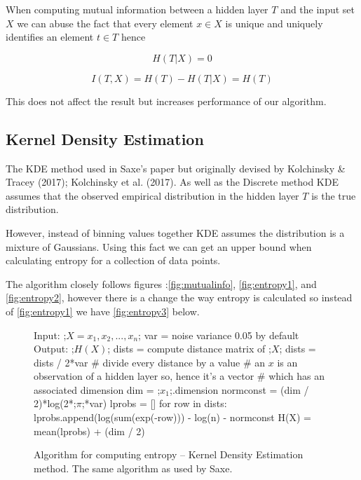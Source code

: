 When computing mutual information between a hidden layer $T$ and the input set
$X$ we can abuse the fact that every element $x\in X$ is unique and uniquely
identifies an element $t\in T$ hence 

\begin{equation}
  H(T|X) = 0 
\end{equation}

\begin{equation}
  I(T, X) = H(T) - H(T|X) = H(T) 
\end{equation}

This does not affect the result but increases performance of our algorithm.

\subsection{Kernel Density Estimation}

  The KDE method used in Saxe's paper but originally devised by Kolchinsky \&
  Tracey (2017); Kolchinsky et al. (2017). As well as the Discrete method KDE
  assumes that the observed empirical distribution in the hidden layer $T$ is
  the true distribution. 

  However, instead of binning values together KDE assumes the distribution is a
  mixture of Gaussians. Using this fact we can get an upper bound when
  calculating entropy for a collection of data points.

  The algorithm closely follows figures :\autoref{fig:mutualinfo},
  \autoref{fig:entropy1}, and \autoref{fig:entropy2}, however there is a change
  the way entropy is calculated so instead of \autoref{fig:entropy1} we have
  \autoref{fig:entropy3} below.

\begin{figure}[H]
    \begin{pythonfigure}
      Input: 
      ;$X = x_1, x_2,...,x_n$;  
      var = noise variance 0.05 by default
      Output: ;$H(X)$;
      dists = compute distance matrix of ;$X$;
      dists = dists / 2*var # divide every distance by a value
      # an $x$ is an observation of a hidden layer so, hence it's a vector 
      # which has an associated dimension
      dim = ;$x_1$;.dimension
      normconst = (dim / 2)*log(2*;$\pi$;*var)
      lprobs = []
      for row in dists:
        lprobs.append(log(sum(exp(-row))) - log(n) - normconst
      H(X) = mean(lprobs) + (dim / 2)
    \end{pythonfigure}
    \caption{Algorithm for computing entropy -- Kernel Density Estimation method.
    The same algorithm as used by Saxe.}
    \label{fig:entropy3}
\end{figure} 


